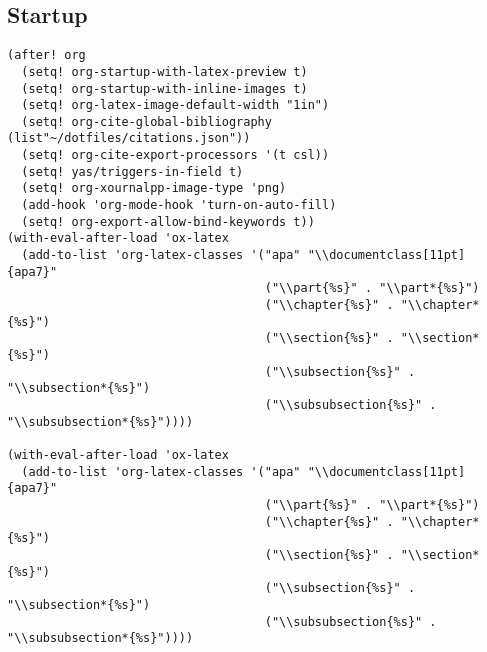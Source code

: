 \documentclass[11pt]{article}
\begin{document}
\subsection*{Startup}
\label{sec:orgbd5fd8e}
\begin{verbatim}
(after! org
  (setq! org-startup-with-latex-preview t)
  (setq! org-startup-with-inline-images t)
  (setq! org-latex-image-default-width "1in")
  (setq! org-cite-global-bibliography (list"~/dotfiles/citations.json"))
  (setq! org-cite-export-processors '(t csl))
  (setq! yas/triggers-in-field t)
  (setq! org-xournalpp-image-type 'png)
  (add-hook 'org-mode-hook 'turn-on-auto-fill)
  (setq! org-export-allow-bind-keywords t))
(with-eval-after-load 'ox-latex
  (add-to-list 'org-latex-classes '("apa" "\\documentclass[11pt]{apa7}"
                                    ("\\part{%s}" . "\\part*{%s}")
                                    ("\\chapter{%s}" . "\\chapter*{%s}")
                                    ("\\section{%s}" . "\\section*{%s}")
                                    ("\\subsection{%s}" . "\\subsection*{%s}")
                                    ("\\subsubsection{%s}" . "\\subsubsection*{%s}"))))

(with-eval-after-load 'ox-latex
  (add-to-list 'org-latex-classes '("apa" "\\documentclass[11pt]{apa7}"
                                    ("\\part{%s}" . "\\part*{%s}")
                                    ("\\chapter{%s}" . "\\chapter*{%s}")
                                    ("\\section{%s}" . "\\section*{%s}")
                                    ("\\subsection{%s}" . "\\subsection*{%s}")
                                    ("\\subsubsection{%s}" . "\\subsubsection*{%s}"))))


\end{verbatim}
\end{document}
